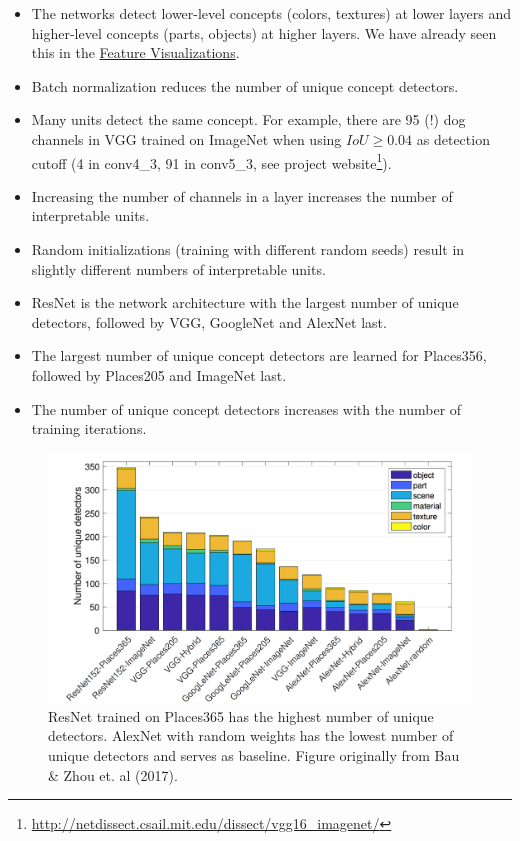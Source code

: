 \documentclass[12pt,]{krantz}
\providecommand{\tightlist}{%
  \setlength{\itemsep}{0pt}\setlength{\parskip}{0pt}}
\renewcommand{\href}[2]{#2\footnote{\url{#1}}}
\begin{document}
\begin{itemize}
\tightlist
\item
  The networks detect lower-level concepts (colors, textures) at lower
  layers and higher-level concepts (parts, objects) at higher layers. We
  have already seen this in the
  \protect\hyperlink{feature-visualization}{Feature Visualizations}.
\item
  Batch normalization reduces the number of unique concept detectors.
\item
  Many units detect the same concept. For example, there are 95 (!) dog
  channels in VGG trained on ImageNet when using \(IoU \geq 0.04\) as
  detection cutoff (4 in conv4\_3, 91 in conv5\_3, see
  \href{http://netdissect.csail.mit.edu/dissect/vgg16_imagenet/}{project
  website}).
\item
  Increasing the number of channels in a layer increases the number of
  interpretable units.
\item
  Random initializations (training with different random seeds) result
  in slightly different numbers of interpretable units.
\item
  ResNet is the network architecture with the largest number of unique
  detectors, followed by VGG, GoogleNet and AlexNet last.
\item
  The largest number of unique concept detectors are learned for
  Places356, followed by Places205 and ImageNet last.
\item
  The number of unique concept detectors increases with the number of
  training iterations.
\end{itemize}

\begin{figure}

{\centering \includegraphics[width=\textwidth]{images/arch-compare} 

}

\caption{ResNet trained on Places365 has the highest number of unique detectors. AlexNet with random weights has the lowest number of unique detectors and serves as baseline. Figure originally from Bau \& Zhou et. al (2017).}\label{fig:unnamed-chunk-58}
\end{figure}
\end{document}
